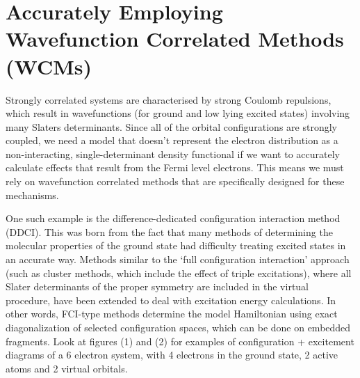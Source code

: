 \documentclass[10pt]{article}
\begin{document}
\section{Accurately Employing Wavefunction Correlated Methods (WCMs)}

Strongly correlated systems are characterised by strong Coulomb repulsions, which result in wavefunctions (for ground and low lying excited states) involving many Slaters determinants. Since all of the orbital configurations are strongly coupled, we need a model that doesn't represent the electron distribution as a non-interacting, single-determinant density functional if we want to accurately calculate effects that result from the Fermi level electrons. This means we must rely on wavefunction correlated methods that are specifically designed for these mechanisms. 

One such example is the difference-dedicated configuration interaction method (DDCI). This was born from the fact that many methods of determining the molecular properties of the ground state had difficulty treating excited states in an accurate way. Methods similar to the `full configuration interaction' approach (such as cluster methods, which include the effect of triple excitations), where all Slater determinants of the proper symmetry are included in the virtual procedure, have been extended to deal with excitation energy calculations. In other words, FCI-type methods determine the model Hamiltonian using exact diagonalization of selected configuration spaces, which can be done on embedded fragments. Look at figures (1) and (2) for examples of configuration + excitement diagrams of a 6 electron system, with 4 electrons in the ground state, 2 active atoms and 2 virtual orbitals.
\end{document}
